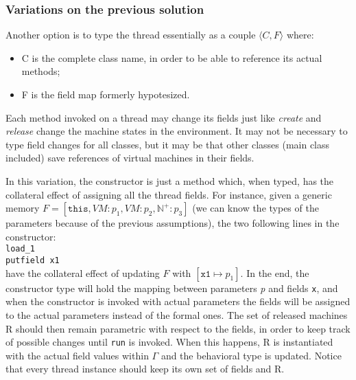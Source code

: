 \documentclass{amsart}
\newcommand{\N}{\mathbb{N}}
\newcommand{\Int}{\N^+}
\newcommand{\wrt}{with respect to}
\numberwithin{equation}{section}
\theoremstyle{plain} %
\theoremstyle{definition}
\theoremstyle{remark}
\begin{document}
\subsubsection{Variations on the previous solution}
Another option is to type the thread essentially as a couple $\langle C, F \rangle$ where:
\begin{itemize}
\item C is the complete class name, in order to be able to reference its actual methods;
\item F is the field map formerly hypotesized.
\end{itemize}

Each method invoked on a thread may change its fields just like \emph{create} and \emph{release} change the machine states in the environment. It may not be necessary to type field changes for all classes, but it may be that other classes (main class included) save references of virtual machines in their fields.

In this variation, the constructor is just a method which, when typed, has the collateral effect of assigning all the thread fields. For instance, given a generic memory $F = [\texttt{this}, VM:p_1, VM:p_2, \Int:p_3]$ (we can know the types of the parameters because of the previous assumptions), the two following lines in the constructor:\\
\texttt{load\_1 \\ putfield x1}\\
have the collateral effect of updating $F$ with $[\texttt{x1} \mapsto p_1]$. In the end, the constructor type will hold the mapping between parameters \emph{p} and fields \texttt{x}, and when the constructor is invoked with actual parameters the fields will be assigned to the actual parameters instead of the formal ones. The set of released machines R should then remain parametric \wrt{} the fields, in order to keep track of possible changes until \texttt{run} is invoked. When this happens, R is instantiated with the actual field values within $\Gamma$ and the behavioral type is updated. Notice that every thread instance should keep its own set of fields and R.

\newpage
\end{document}
